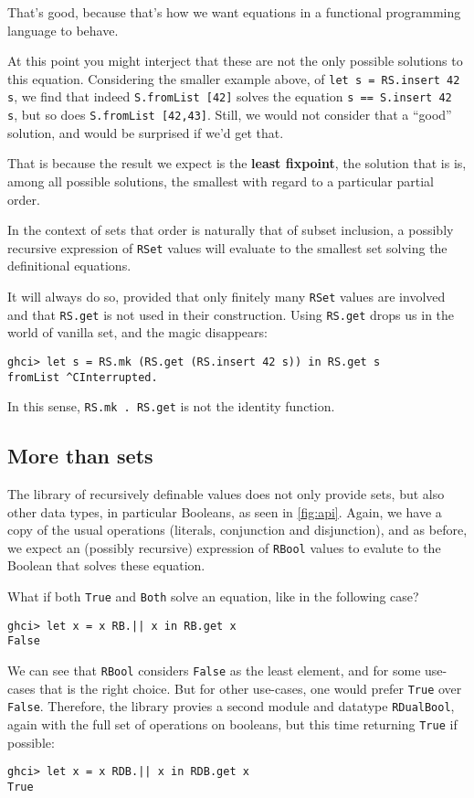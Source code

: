 \documentclass[manuscript,screen,acmsmall]{acmart}
\begin{document}
That’s good, because that’s how we want equations in a functional programming language to behave.

At this point you might interject that these are not the only possible solutions to this equation. Considering the smaller example above, of \verb|let s = RS.insert 42 s|, we find that indeed \verb|S.fromList [42]| solves the equation \verb|s == S.insert 42 s|, but so does \verb|S.fromList [42,43]|. Still, we would not consider that a “good” solution, and would be surprised if we'd get that.

That is because the result we expect is the \textbf{least fixpoint}, the solution that is is, among all possible solutions, the smallest with regard to a particular partial order.

In the context of sets that order is naturally that of subset inclusion, a possibly recursive expression of \verb|RSet| values will evaluate to the smallest set solving the definitional equations.

It will always do so, provided that only finitely many \verb|RSet| values are involved and that \verb|RS.get| is not used in their construction. Using \verb|RS.get| drops us in the world of vanilla set, and the magic disappears:
\begin{verbatim}
ghci> let s = RS.mk (RS.get (RS.insert 42 s)) in RS.get s
fromList ^CInterrupted.
\end{verbatim}
In this sense, \verb|RS.mk . RS.get| is not the identity function.

\subsection{More than sets}

The library of recursively definable values does not only provide sets, but also other data types, in particular Booleans, as seen in \cref{fig:api}. Again, we have a copy of the usual operations (literals, conjunction and disjunction), and as before, we expect an (possibly recursive) expression of \verb|RBool| values to evalute to the Boolean that solves these equation.

What if both \verb|True| and \verb|Both| solve an equation, like in the following case?
\begin{verbatim}
ghci> let x = x RB.|| x in RB.get x
False
\end{verbatim}
We can see that \verb|RBool| considers \verb|False| as the least element, and for some use-cases that is the right choice. But for other use-cases, one would prefer \verb|True| over \verb|False|. Therefore, the library provies a second module and datatype \verb|RDualBool|, again with the full set of operations on booleans, but this time returning \verb|True| if possible:
\begin{verbatim}
ghci> let x = x RDB.|| x in RDB.get x
True
\end{verbatim}
\end{document}
